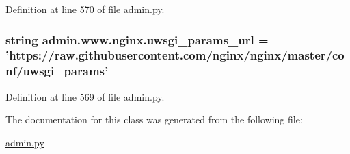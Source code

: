 Definition at line 570 of file admin.\-py.

\hypertarget{classadmin_1_1www_1_1nginx_aec1e7959ddfe6598718fb6c8c9d72320}{
\subsubsection[{uwsgi\-\_\-params\-\_\-url}]{\setlength{\rightskip}{0pt plus 5cm}string admin.\-www.\-nginx.\-uwsgi\-\_\-params\-\_\-url = 'https\-://raw.\-githubusercontent.\-com/{\bf nginx}/{\bf nginx}/master/conf/uwsgi\-\_\-params'\hspace{0.3cm}{\ttfamily [static]}}}\label{classadmin_1_1www_1_1nginx_aec1e7959ddfe6598718fb6c8c9d72320}


Definition at line 569 of file admin.\-py.



The documentation for this class was generated from the following file\-:\begin{DoxyCompactItemize}
\item 
\hyperlink{admin_8py}{admin.\-py}\end{DoxyCompactItemize}
